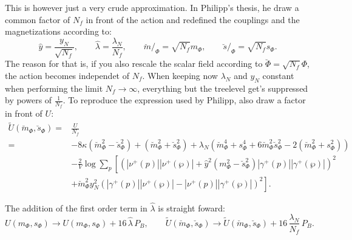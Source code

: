 This is however just a very crude approximation. In Philipp's thesis, he draw a common factor of $N_f$ in front of the action and redefined the couplings 
and the magnetizations according to:
\begin{equation}\label{eq:def_reparametrization_couplingsAndMagnetization_Nf}
 \hat y = \frac{y_N}{\sqrt{N_f}},\qquad
 \hat \lambda = \frac{\lambda_N}{N_f},\qquad
 \breve{m}/_{\Phi} = \sqrt{N_f} m_{\Phi},\qquad
 \breve{s}/_{\Phi} = \sqrt{N_f} s_{\Phi}.
\end{equation}
The reason for that is, if you also rescale the scalar field according to $\breve{\Phi}=\sqrt{N_f}\Phi$, the action becomes independet of $N_f$. 
When keeping now $\lambda_N$ and $y_N$ constant when performing the limit $N_f \rightarrow \infty$, everything but the treelevel get's suppressed by 
powers of $\frac{1}{N_f}$.
To reproduce the expression used by Philipp, also draw a factor in front of $U$:
\begin{align}\label{eq:CEP_treelevel_reparametrized}
 \tilde U(\breve{m}_{\Phi},\breve{s}_{\Phi}) =& \frac{U}{N_f} \nonumber \\
            =& -8 \kappa \left( \breve{m}_{\Phi}^2 - \breve{s}_{\Phi}^2 \right)   +   \left( \breve{m}_{\Phi}^2 + \breve{s}_{\Phi}^2 \right)
                         + \lambda_N \left( \breve{m}_{\Phi}^4 + s_{\Phi}^4 + 6 \breve{m}_{\Phi}^2 \breve{s}_{\Phi}^2
                         - 2 \left(\breve{m}_{\Phi}^2 + s_{\Phi}^2 \right) \right) 
                           \nonumber \\
                        & -\frac{2}{V} \log \sum\limits_p
                                    \left[ \left( |\nu^+(p)| |\nu^+(\wp)|   +
                                    \hat y ^2 \left( m_{\Phi}^2 - \breve{s}_{\Phi}^2 \right) |\gamma^+(p)| |\gamma^+(\wp)|\right)^2 
                                    \nonumber \right. \\ 
                        & \left. +  \breve{m}_{\Phi}^2 y_N^2 \left( |\gamma^+(p)| |\nu^+(\wp)|   -   |\nu^+(p)| |\gamma^+(\wp)| \right)^2\right].
\end{align}

The addition of the first order term in $\hat \lambda$ is straight foward:
\begin{equation}\label{eq:CEP_oneLoopAddition}
 U(m_{\Phi}, s_{\Phi}) \rightarrow U(m_{\Phi}, s_{\Phi}) + 16\, \hat \lambda\, P_B, \qquad 
 \tilde U(\breve{m}_{\Phi},\breve{s}_{\Phi}) \rightarrow  \tilde U(\breve{m}_{\Phi},\breve{s}_{\Phi}) + 16 \,\frac{\lambda_N}{N_f}\, P_B.
\end{equation}





